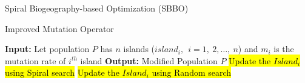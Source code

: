 \documentclass [9pt,times] {beamer}
\begin{document}
\begin{frame}{Spiral Biogeography-based Optimization (SBBO)}

\begin{block}{Improved Mutation Operator }
\begin{algorithm}[H]
\scriptsize
\begin{algorithmic}[1]
\STATE \textbf{Input:} Let population $P$ has $n$ islands ($island_i,\ \ i=1,\ 2,\dots, \ n$) and $m_i$ is the mutation rate of $i^{th}$ island 
	\STATE \textbf{Output: } Modified Population $P$
        \STATE \hl{Update the $Island_i$ using Spiral search}
    \ELSE
         \STATE \hl{Update the $Island_i$ using Random search}
   
    \ENDIF
    \ENDFOR
\end{algorithmic}
\end{algorithm}
\end{block}

\end{frame}
\end{document}

